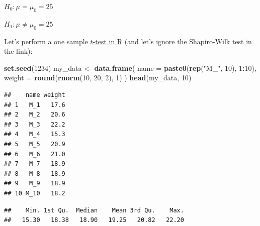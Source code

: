 \documentclass[
]{book}
\newenvironment{Shaded}{\begin{snugshade}}{\end{snugshade}}
\newcommand{\AttributeTok}[1]{\textcolor[rgb]{0.13,0.29,0.53}{#1}}
\newcommand{\ConstantTok}[1]{\textcolor[rgb]{0.56,0.35,0.01}{#1}}
\newcommand{\DecValTok}[1]{\textcolor[rgb]{0.00,0.00,0.81}{#1}}
\newcommand{\FunctionTok}[1]{\textcolor[rgb]{0.13,0.29,0.53}{\textbf{#1}}}
\newcommand{\NormalTok}[1]{#1}
\newcommand{\OtherTok}[1]{\textcolor[rgb]{0.56,0.35,0.01}{#1}}
\newcommand{\SpecialCharTok}[1]{\textcolor[rgb]{0.81,0.36,0.00}{\textbf{#1}}}
\newcommand{\StringTok}[1]{\textcolor[rgb]{0.31,0.60,0.02}{#1}}
\begin{document}
\(H_0: \mu = \mu_0 = 25\)

\(H_1: \mu \ne \mu_0 = 25\)

Let's perform a one sample \href{https://www.sthda.com/english/wiki/one-sample-t-test-in-r}{\(t\)-test in R}
(and let's ignore the Shapiro-Wilk test in the link):

\begin{Shaded}
\begin{Highlighting}[]
\FunctionTok{set.seed}\NormalTok{(}\DecValTok{1234}\NormalTok{)}
\NormalTok{my\_data }\OtherTok{\textless{}{-}} \FunctionTok{data.frame}\NormalTok{(}
  \AttributeTok{name =} \FunctionTok{paste0}\NormalTok{(}\FunctionTok{rep}\NormalTok{(}\StringTok{"M\_"}\NormalTok{, }\DecValTok{10}\NormalTok{), }\DecValTok{1}\SpecialCharTok{:}\DecValTok{10}\NormalTok{),}
  \AttributeTok{weight =} \FunctionTok{round}\NormalTok{(}\FunctionTok{rnorm}\NormalTok{(}\DecValTok{10}\NormalTok{, }\DecValTok{20}\NormalTok{, }\DecValTok{2}\NormalTok{), }\DecValTok{1}\NormalTok{)}
\NormalTok{)}
\FunctionTok{head}\NormalTok{(my\_data, }\DecValTok{10}\NormalTok{)}
\end{Highlighting}
\end{Shaded}

\begin{verbatim}
##    name weight
## 1   M_1   17.6
## 2   M_2   20.6
## 3   M_3   22.2
## 4   M_4   15.3
## 5   M_5   20.9
## 6   M_6   21.0
## 7   M_7   18.9
## 8   M_8   18.9
## 9   M_9   18.9
## 10 M_10   18.2
\end{verbatim}

\begin{Shaded}
\end{Shaded}

\begin{verbatim}
##    Min. 1st Qu.  Median    Mean 3rd Qu.    Max. 
##   15.30   18.38   18.90   19.25   20.82   22.20
\end{verbatim}

\begin{Shaded}
\end{Shaded}
\end{document}
